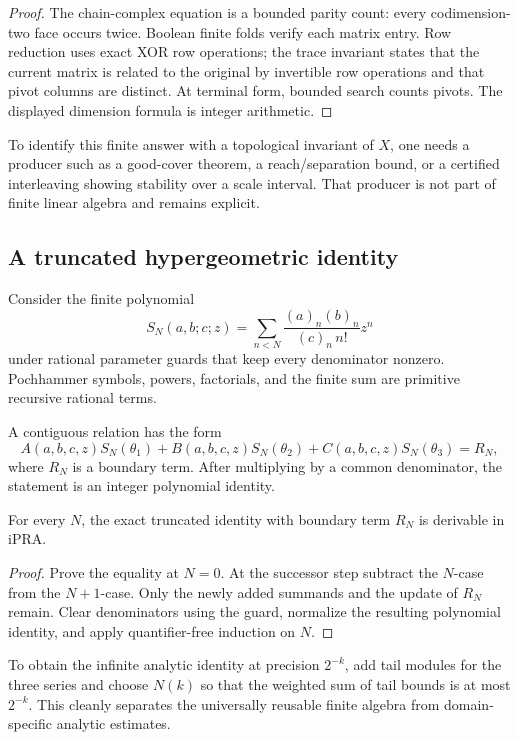 \begin{proof}
The chain-complex equation is a bounded parity count: every codimension-two
face occurs twice.  Boolean finite folds verify each matrix entry.  Row
reduction uses exact XOR row operations; the trace invariant states that the
current matrix is related to the original by invertible row operations and
that pivot columns are distinct.  At terminal form, bounded search counts
pivots.  The displayed dimension formula is integer arithmetic.
\end{proof}

To identify this finite answer with a topological invariant of \(X\), one needs
a producer such as a good-cover theorem, a reach/separation bound, or a
certified interleaving showing stability over a scale interval.  That producer
is not part of finite linear algebra and remains explicit.

\subsection{A truncated hypergeometric identity}

Consider the finite polynomial
\[
  S_N(a,b;c;z)
   =\sum_{n<N}
      \frac{(a)_n(b)_n}{(c)_n\,n!}z^n
\]
under rational parameter guards that keep every denominator nonzero.
Pochhammer symbols, powers, factorials, and the finite sum are primitive
recursive rational terms.

A contiguous relation has the form
\[
  A(a,b,c,z)S_N(\theta_1)
  +B(a,b,c,z)S_N(\theta_2)
  +C(a,b,c,z)S_N(\theta_3)
  =R_N,
\]
where \(R_N\) is a boundary term.  After multiplying by a common denominator,
the statement is an integer polynomial identity.

\begin{theorem}
For every \(N\), the exact truncated identity with boundary term \(R_N\) is
derivable in iPRA.
\end{theorem}

\begin{proof}
Prove the equality at \(N=0\).  At the successor step subtract the \(N\)-case
from the \(N+1\)-case.  Only the newly added summands and the update of
\(R_N\) remain.  Clear denominators using the guard, normalize the resulting
polynomial identity, and apply quantifier-free induction on \(N\).
\end{proof}

To obtain the infinite analytic identity at precision \(2^{-k}\), add tail
modules for the three series and choose \(N(k)\) so that the weighted sum of
tail bounds is at most \(2^{-k}\).  This cleanly separates the universally
reusable finite algebra from domain-specific analytic estimates.

